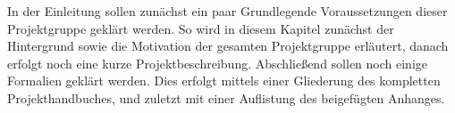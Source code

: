 
In der Einleitung sollen zunächst ein paar Grundlegende Voraussetzungen dieser Projektgruppe geklärt werden. So wird in diesem Kapitel zunächst der Hintergrund sowie die Motivation der gesamten Projektgruppe erläutert, danach erfolgt noch eine kurze Projektbeschreibung. Abschließend sollen noch einige Formalien geklärt werden. Dies erfolgt mittels einer Gliederung des kompletten Projekthandbuches, und zuletzt mit einer Auflistung des beigefügten Anhanges.







